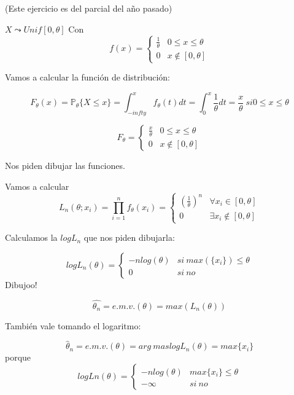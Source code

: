 \begin{problem}[11]
(Este ejercicio es del parcial del año pasado)

\solution

$X \leadsto Unif[0,\theta]$
Con \[ f(x) = \displaystyle\left\{\begin{array}{cc}
\frac{1}{\theta} & 0\leq x \leq \theta\\
0 & x \notin [0,\theta]
\end{array}\right.\]

Vamos a calcular la función de distribución:

\[F_{\theta} (x) = \mathbb{P}_{\theta}\{X\leq x\} = \int_{-infty}^x f_{\theta}(t)dt = \int_0^x \frac{1}{\theta} dt = \frac{x}{\theta} \ si 0\leq x \leq \theta\]

\[F_{\theta} = \left\{\begin{array}{cc}
\frac{x}{\theta} & 0\leq x \leq \theta\\
0 & x \notin [0,\theta]
\end{array}\right.\]

Nos piden dibujar las funciones. 


Vamos a calcular \[L_n(\theta;x_i) = \prod_{i=1}^n f_{\theta} (x_i) = \left\{\begin{array}{cc}
\left(\frac{1}{\theta}\right)^n & \forall x_i \in [0,\theta]\\
0 & \exists x_i\notin [0,\theta]
\end{array}\right.\]

Calculamos la $logL_n$ que nos piden dibujarla:

\[logL_n(\theta) = \left\{\begin{array}{cc}
-nlog(\theta) & si \ max(\{x_i\})\leq \theta\\
0 & si \ no
\end{array}\right.\]
Dibujoo!

\[\hat{\theta_n} = e.m.v.(\theta) = max\left(L_n(\theta)\right)\]

También vale tomando el logaritmo:

\[\hat{\theta}_n = e.m.v. (\theta) = arg\ mas logL_n(\theta) = max\{x_i\}\]
porque \[ logLn(\theta) = \displaystyle\left\{\begin{array}{cc}
-nlog(\theta) & max\{x_i\} \leq \theta\\
-\infty & si \ no
\end{array}\right.\]
\end{problem}


